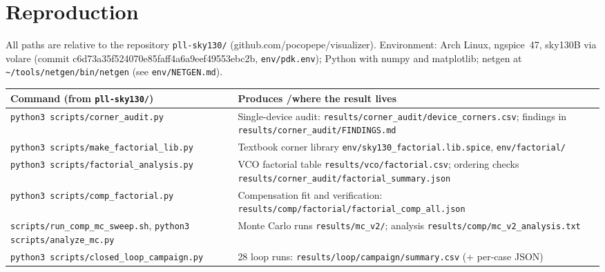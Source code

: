 \documentclass[11pt,a4paper]{article}
\begin{document}
\section{Reproduction}
All paths are relative to the repository \texttt{pll-sky130/\allowbreak } (github.com/\allowbreak pocopepe/\allowbreak visualizer). Environment: Arch Linux, ngspice~47, sky130B via volare (commit c6d73a35f524070e85faff4a6a9eef49553ebc2b, \texttt{env/\allowbreak pdk.env}); Python with numpy and matplotlib; netgen at \texttt{\textasciitilde/\allowbreak tools/\allowbreak netgen/\allowbreak bin/\allowbreak netgen} (see \texttt{env/\allowbreak NETGEN.md}).
\begin{table}[!htbp]\centering\footnotesize\raggedright
\begin{tabular}{p{6.6cm}p{8.4cm}}\toprule
Command (from \texttt{pll-sky130/\allowbreak }) & Produces /\allowbreak  where the result lives\\\midrule
\texttt{python3 scripts/\allowbreak corner\_\allowbreak audit.py} & Single-device audit: \texttt{results/\allowbreak corner\_\allowbreak audit/\allowbreak device\_\allowbreak corners.csv}; findings in \texttt{results/\allowbreak corner\_\allowbreak audit/\allowbreak FINDINGS.md}\\
\texttt{python3 scripts/\allowbreak make\_\allowbreak factorial\_\allowbreak lib.py} & Textbook corner library \texttt{env/\allowbreak sky130\_\allowbreak factorial.lib.spice}, \texttt{env/\allowbreak factorial/\allowbreak }\\
\texttt{python3 scripts/\allowbreak factorial\_\allowbreak analysis.py} & VCO factorial table \texttt{results/\allowbreak vco/\allowbreak factorial.csv}; ordering checks \texttt{results/\allowbreak corner\_\allowbreak audit/\allowbreak factorial\_\allowbreak summary.json}\\
\texttt{python3 scripts/\allowbreak comp\_\allowbreak factorial.py} & Compensation fit and verification: \texttt{results/\allowbreak comp/\allowbreak factorial/\allowbreak factorial\_\allowbreak comp\_\allowbreak all.json}\\
\texttt{scripts/\allowbreak run\_\allowbreak comp\_\allowbreak mc\_\allowbreak sweep.sh}, \texttt{python3 scripts/\allowbreak analyze\_\allowbreak mc.py} & Monte Carlo runs \texttt{results/\allowbreak mc\_\allowbreak v2/\allowbreak }; analysis \texttt{results/\allowbreak comp/\allowbreak mc\_\allowbreak v2\_\allowbreak analysis.txt}\\
\texttt{python3 scripts/\allowbreak closed\_\allowbreak loop\_\allowbreak campaign.py} & 28 loop runs: \texttt{results/\allowbreak loop/\allowbreak campaign/\allowbreak summary.csv} (+ per-case JSON)\\

\end{tabular}
\end{table}
\end{document}
